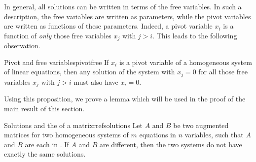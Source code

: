 In general, all solutions can be written in terms of the free
variables. In such a description, the free variables are written as
parameters, while the pivot variables are written as functions of
these parameters. Indeed, a pivot variable $x_i$ is a function of {\em
  only} those free variables $x_j$ with $j>i$. This leads to the
following observation.

\begin{proposition}{Pivot and free variables}{pivotfree}
  If $x_i$ is a pivot variable of a homogeneous system of linear
  equations, then any solution of the system with $x_j=0$ for all
  those free variables $x_j$ with $j>i$ must also have $x_i=0$.
\end{proposition}

Using this proposition, we prove a lemma which will be used in the
proof of the main result of this section.

\begin{lemma}{Solutions and the {\rref} of a matrix}{rrefsolutions}
  Let $A$ and $B$ be two augmented matrices for two homogeneous
  systems of $m$ equations in $n$ variables, such that $A$ and $B$ are
  each in {\rref}. If $A$ and $B$ are different, then the two systems
  do not have exactly the same solutions.
\end{lemma}

